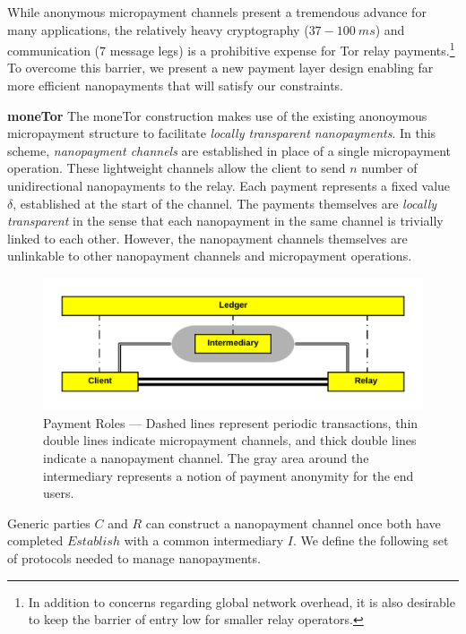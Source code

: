 While anonymous micropayment channels present a tremendous advance for many
applications, the relatively heavy cryptography ($37-100\ ms$) and communication
(7 message legs) is a prohibitive expense for Tor relay payments.\footnote{In addition to
concerns regarding global network overhead, it is also desirable to keep the
barrier of entry low for smaller relay operators.} To overcome this
barrier, we present a new payment layer design enabling far more efficient
nanopayments that will satisfy our constraints.

\textbf{moneTor} The moneTor construction makes use of the existing anonoymous
micropayment structure to facilitate \emph{locally transparent nanopayments}. In
this scheme, \emph{nanopayment channels} are established in place of a single
micropayment operation. These lightweight channels allow the client to send $n$
number of unidirectional nanopayments to the relay. Each payment represents a
fixed value $\delta$, established at the start of the channel. The payments
themselves are \emph{locally transparent} in the sense that each nanopayment in
the same channel is trivially linked to each other. However, the nanopayment
channels themselves are unlinkable to other nanopayment channels and
micropayment operations.

\begin{figure}[h] \centering
  \includegraphics[scale=0.6]{images/party_diagram.png}
  \caption[Payment Roles]{Payment Roles --- Dashed lines represent periodic
    transactions, thin double lines indicate micropayment channels, and thick
    double lines indicate a nanopayment channel. The gray area around the
    intermediary represents a notion of payment anonymity for the end users.}
  \label{fig:parties}
\end{figure}

Generic parties $C$ and $R$ can construct a nanopayment channel once both have
completed $Establish$ with a common intermediary $I$. We define the following
set of protocols needed to manage nanopayments.

